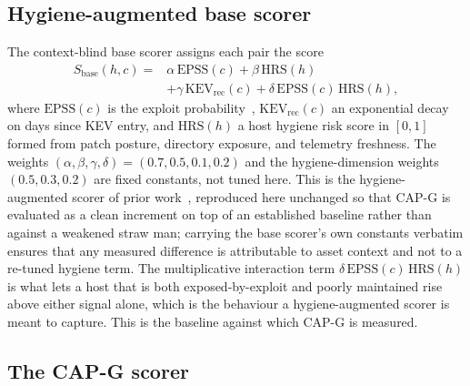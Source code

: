 \subsection{Hygiene-augmented base scorer}

The context-blind base scorer assigns each pair the score
%
\begin{equation}
\begin{split}
S_{\mathrm{base}}(h,c) = {}&\alpha\,\mathrm{EPSS}(c) + \beta\,\mathrm{HRS}(h) \\
&+ \gamma\,\mathrm{KEV_{rec}}(c) + \delta\,\mathrm{EPSS}(c)\,\mathrm{HRS}(h),
\end{split}
\end{equation}
%
where $\mathrm{EPSS}(c)$ is the exploit probability~\cite{jacobs2021epss},
$\mathrm{KEV_{rec}}(c)$ an exponential decay on days since KEV entry, and $\mathrm{HRS}(h)$
a host hygiene risk score in $[0,1]$ formed from patch posture, directory exposure, and
telemetry freshness. The weights $(\alpha,\beta,\gamma,\delta){=}(0.7,0.5,0.1,0.2)$ and the
hygiene-dimension weights $(0.5,0.3,0.2)$ are fixed constants, not tuned here. This is the
hygiene-augmented scorer of prior work~\cite{paper4hygieneprio,paper1vulnprio}, reproduced here
unchanged so that CAP-G is evaluated as a clean increment on top of an established baseline
rather than against a weakened straw man; carrying the base scorer's own constants verbatim
ensures that any measured difference is attributable to asset context and not to a re-tuned
hygiene term. The multiplicative interaction term $\delta\,\mathrm{EPSS}(c)\,\mathrm{HRS}(h)$
is what lets a host that is both exposed-by-exploit and poorly maintained rise above either
signal alone, which is the behaviour a hygiene-augmented scorer is meant to capture. This is the
baseline against which CAP-G is measured.

\subsection{The CAP-G scorer}

